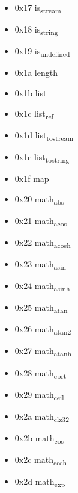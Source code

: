 \begin{itemize}
\item 0x17 is\textsubscript{stream}

\item 0x18 is\textsubscript{string}

\item 0x19 is\textsubscript{undefined}

\item 0x1a length

\item 0x1b list

\item 0x1c list\textsubscript{ref}

\item 0x1d list\textsubscript{to}\textsubscript{stream}

\item 0x1e list\textsubscript{to}\textsubscript{string}

\item 0x1f map

\item 0x20 math\textsubscript{abs}

\item 0x21 math\textsubscript{acos}

\item 0x22 math\textsubscript{acosh}

\item 0x23 math\textsubscript{asin}

\item 0x24 math\textsubscript{asinh}

\item 0x25 math\textsubscript{atan}

\item 0x26 math\textsubscript{atan2}

\item 0x27 math\textsubscript{atanh}

\item 0x28 math\textsubscript{cbrt}

\item 0x29 math\textsubscript{ceil}

\item 0x2a math\textsubscript{clz32}

\item 0x2b math\textsubscript{cos}

\item 0x2c math\textsubscript{cosh}

\item 0x2d math\textsubscript{exp}


\end{itemize}
